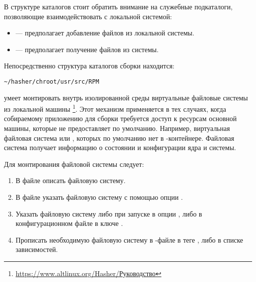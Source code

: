 В структуре каталогов  стоит обратить внимание на служебные подкаталоги,
позволяющие взаимодействовать с локальной системой:
\begin{itemize}
	\item {} --- предполагает добавление файлов из локальной системы.
	\item {} --- предполагает получение файлов из  системы.
\end{itemize}

Непосредственно структура каталогов  сборки находится:
\begin{verbatim}
~/hasher/chroot/usr/src/RPM
\end{verbatim}

 умеет монтировать внутрь изолированной среды виртуальные файловые системы
из локальной машины%
\footnote{\href{https://www.altlinux.org/Hasher/\%D0\%A0\%D1\%83\%D0\%BA\%D0\%BE\%D0\%B2\%D0\%BE\%D0\%B4\%D1\%81\%D1\%82\%D0\%B2\%D0\%BE\#\%D0\%9C\%D0\%BE\%D0\%BD\%D1\%82\%D0\%B8\%D1\%80\%D0\%BE\%D0\%B2\%D0\%B0\%D0\%BD\%D0\%B8\%D0\%B5_\%D1\%84\%D0\%B0\%D0\%B9\%D0\%BB\%D0\%BE\%D0\%B2\%D1\%8B\%D1\%85_\%D1\%81\%D0\%B8\%D1\%81\%D1\%82\%D0\%B5\%D0\%BC_\%D0\%B2\%D0\%BD\%D1\%83\%D1\%82\%D1\%80\%D0\%B8_hasher}{https://www.altlinux.org/Hasher/Руководство}}.
Этот механизм применяется в тех случаях, когда собираемому приложению для сборки требуется доступ к ресурсам
основной машины, которые  не предоставляет по умолчанию. Например, виртуальная файловая система
 или , которых по умолчанию нет в -контейнере. Файловая система 
получает информацию о состоянии и конфигурации ядра и системы.

Для монтирования файловой системы следует:
\begin{enumerate}
    \item В файле  описать файловую систему.
    \item В файле  указать файловую систему с помощью опции .
    \item Указать файловую систему либо при запуске  в опции , либо в
        конфигурационном файле  в ключе .
    \item Прописать необходимую файловую систему в -файле в теге , либо в списке зависимостей.
\end{enumerate}


